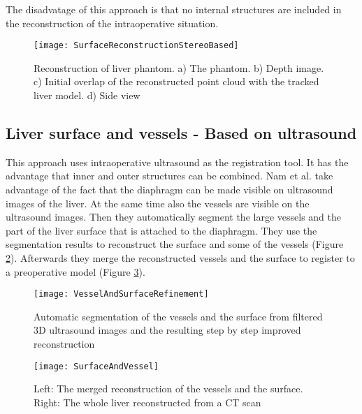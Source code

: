 The disadvatage of this approach is that no internal structures are included in
the reconstruction of the intraoperative situation.
\begin{figure}[H]
  \centering
 \texttt{[image: SurfaceReconstructionStereoBased]}
 \caption{Reconstruction of liver phantom. a) The phantom. b) Depth image. c)
   Initial overlap of the reconstructed point cloud with the tracked liver
   model. d) Side view \cite{speidel2011intraoperative}}
  \label{fig:SurfaceReconstructionStereoBased}
\end{figure}

\subsection{Liver surface and vessels - Based on ultrasound}
This approach uses intraoperative ultrasound as the registration tool. It has
the advantage that inner and outer structures can be combined. Nam et al. \cite{nam2011automatic} take
advantage of the fact that the diaphragm can be made visible on ultrasound
images of the liver. At the same time also the vessels
are visible on the ultrasound images. Then they automatically segment the large
vessels and the part of the liver surface that is attached to the diaphragm.
They use the segmentation results to reconstruct the surface and some of the
vessels (Figure \ref{fig:VesselAndSurfaceRefinement}). Afterwards they merge the
reconstructed vessels and the surface to register to a preoperative model
(Figure \ref{fig:SurfaceAndVessel}).


\begin{figure}[H]
  \centering
 \texttt{[image: VesselAndSurfaceRefinement]}
 \caption{Automatic segmentation of the vessels and the surface from filtered 3D
   ultrasound images and the resulting step by step improved reconstruction \cite{nam2011automatic}}
  \label{fig:VesselAndSurfaceRefinement}
\end{figure}

\begin{figure}[H]
  \centering
 \texttt{[image: SurfaceAndVessel]}
 \caption{Left: The merged reconstruction of the vessels and the surface. Right:
   The whole liver reconstructed from a CT scan \cite{nam2011automatic}}
  \label{fig:SurfaceAndVessel}
\end{figure}

